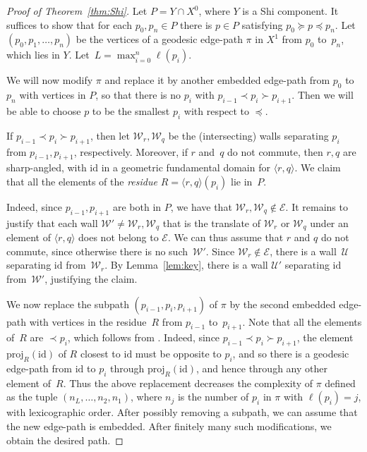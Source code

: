 \documentclass[11pt]{article}
\theoremstyle{definition}
\numberwithin{equation}{section}
\newcommand{\id}{\mathrm{id}}
\newcommand{\W}{\mathcal{W}}
\newcommand{\U}{\mathcal{U}}
\begin{document}
\begin{proof}[Proof of Theorem~\ref{thm:Shi}] Let $P=Y\cap X^0$, where $Y$ is a Shi component.
	It suffices to show that for each $p_0,p_n\in P$ there is $p\in P$ satisfying $p_0\succeq p\preceq p_n$. Let $(p_0,p_1,\ldots,p_n)$ be the
	vertices of a geodesic edge-path $\pi$ in $X^1$ from $p_0$ to~$p_n$, which lies in $Y$. Let~$L=\max_{i=0}^n\ell(p_i)$.
	
	We will now modify $\pi$ and replace it by another embedded edge-path from $p_0$ to~$p_n$ with vertices in $P$, so that there is no
	$p_i$ with $p_{i-1}\prec p_i\succ p_{i+1}$. Then we will be able to choose $p$ to be the smallest $p_i$ with respect to $\preceq$.
	
	If $p_{i-1}\prec p_i\succ p_{i+1}$, then let $\W_r,\W_q$ be the (intersecting) walls separating $p_i$ from $p_{i-1},p_{i+1}$, respectively. Moreover, if $r$ and~$q$ do not commute, then $r,q$ are sharp-angled, with $\id$
	in a geometric fundamental domain for $\langle r,q\rangle$. We claim that all the elements of the \emph{residue} $R=\langle r,q\rangle (p_i)$ lie in~$P$.
	
	Indeed, since $p_{i-1},p_{i+1}$ are both in $P$, we have that $\W_r,\W_q\notin \mathcal E$. 
	It remains to justify that each wall $\W'\neq \W_r,\W_q$ that is the translate
	of $\W_r$ or $\W_q$ under an element of $\langle r,q\rangle$ does not belong to $\mathcal E$. We can thus assume that $r$ and $q$ do not commute, since otherwise there is no
	such~$\W'$. Since $\W_r\notin \mathcal E$, there is a wall~$\U$ separating $\id$ from~$\W_r$. By Lemma~\ref{lem:key}, there is a wall $\U'$ separating $\id$
	from~$\W'$, justifying the claim.
	
	We now replace the subpath $(p_{i-1},p_i,p_{i+1})$ of $\pi$ by the second embedded edge-path with vertices in the residue~$R$ from $p_{i-1}$ to~$p_{i+1}$. Note that all the elements of~$R$ are $\prec p_i$, which follows from \cite[Thm.~2.9]{Ronan_2009}. Indeed, since $p_{i-1}\prec p_i\succ p_{i+1}$, the element $\mathrm{proj}_R(\id)$ of $R$ closest to $\id$ must be opposite to $p_i$, and so there is a geodesic edge-path from $\id$ to $p_i$ through $\mathrm{proj}_R(\id)$, and hence through any other element of~$R$. Thus the above replacement decreases the complexity
	of $\pi$ defined as the tuple $(n_L,\ldots,n_2,n_1)$, where $n_j$ is the number of $p_i$ in $\pi$ with $\ell(p_i)=j$, with lexicographic
	order. After possibly removing a subpath, we can assume that the new edge-path is embedded. After finitely many such modifications, we obtain the desired path.
\end{proof}
\end{document}
